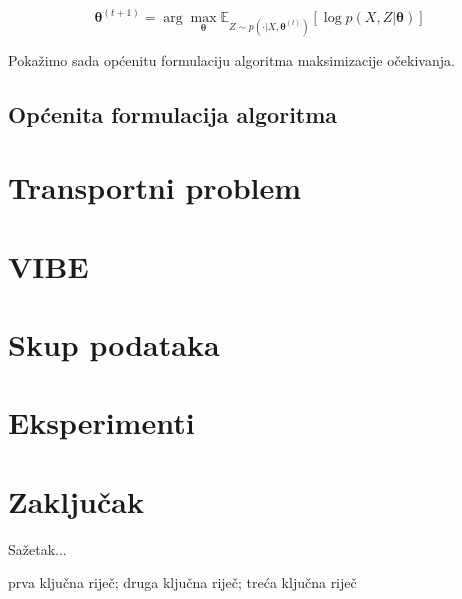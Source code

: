 \documentclass[diplomskirad]{fer}
\begin{document}
\begin{equation}
  \bm{\theta}^{(t + 1)} = \arg \max_{\bm{\theta}} \mathbb{E}_{Z \sim p(\cdot | X, \bm{\theta}^{(t)})} \left[ \log p(X, Z | \bm{\theta}) \right]
  \label{eq:em_alg_basic}
\end{equation}

Pokažimo sada općenitu formulaciju algoritma maksimizacije očekivanja.\

\section{Općenita formulacija algoritma}
\label{sek:general_em}

\chapter{Transportni problem}
\label{pog:transport}


\chapter{VIBE}
\label{pog:vibe}


\chapter{Skup podataka}
\label{pog:skup}


\chapter{Eksperimenti}
\label{pog:eksperimenti}


\chapter{Zaključak}
\label{pog:zakljucak}







\begin{sazetak}
  Sažetak...
\end{sazetak}

\begin{kljucnerijeci}
  prva ključna riječ; druga ključna riječ; treća ključna riječ
\end{kljucnerijeci}
\end{document}
